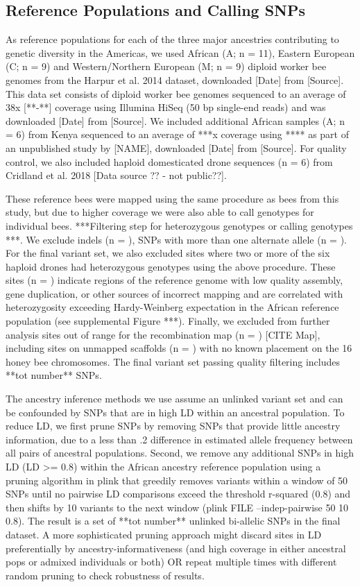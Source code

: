 \documentclass[12pt]{report}
\begin{document}
\subsection{Reference Populations and Calling SNPs}
As reference populations for each of the three major ancestries contributing to genetic diversity in the Americas, we used African (A; n = 11), Eastern European (C; n = 9) and Western/Northern European (M; n = 9) diploid worker bee genomes from the Harpur et al. 2014 dataset, downloaded [Date] from [Source]. This data set consists of diploid worker bee genomes sequenced to an average of 38x [**-**] coverage using Illumina HiSeq (50 bp single-end reads) and was downloaded [Date] from [Source]. We included additional African samples (A; n = 6) from Kenya sequenced to an average of ***x coverage using **** as part of an unpublished study by [NAME], downloaded [Date] from [Source]. For quality control, we also included haploid domesticated drone sequences (n = 6) from Cridland et al. 2018 [Data source ?? - not public??]. \par
These reference bees were mapped using the same procedure as bees from this study, but due to higher coverage we were also able to call genotypes for individual bees. ***Filtering step for heterozygous genotypes or calling genotypes ***. We exclude indels (n = ), SNPs with more than one alternate allele (n = ). For the final variant set, we also excluded sites where two or more of the six haploid drones had heterozygous genotypes using the above procedure. These sites (n = ) indicate regions of the reference genome with low quality assembly, gene duplication, or other sources of incorrect mapping and are correlated with heterozygosity exceeding Hardy-Weinberg expectation in the African reference population (see supplemental Figure ***). Finally, we excluded from further analysis sites out of range for the recombination map (n = ) [CITE Map], including sites on unmapped scaffolds (n = ) with no known placement on the 16 honey bee chromosomes. The final variant set passing quality filtering includes **tot number** SNPs.\par 
The ancestry inference methods we use assume an unlinked variant set and can be confounded by SNPs that are in high LD within an ancestral population. To reduce LD, we first prune SNPs by removing SNPs that provide little ancestry information, due to a less than .2 difference in estimated allele frequency between all pairs of ancestral populations. Second, we remove any additional SNPs in high LD (LD >= 0.8) within the African ancestry reference population using a pruning algorithm in plink that greedily removes variants within a window of 50 SNPs until no pairwise LD comparisons exceed the threshold r-squared (0.8) and then shifts by 10 variants to the next window (plink FILE --indep-pairwise 50 10 0.8). The result is a set of **tot number** unlinked bi-allelic SNPs in the final dataset. A more sophisticated pruning approach might discard sites in LD preferentially by ancestry-informativeness (and high coverage in either ancestral pops or admixed individuals or both) OR repeat multiple times with different random pruning to check robustness of results.\par
\end{document}
